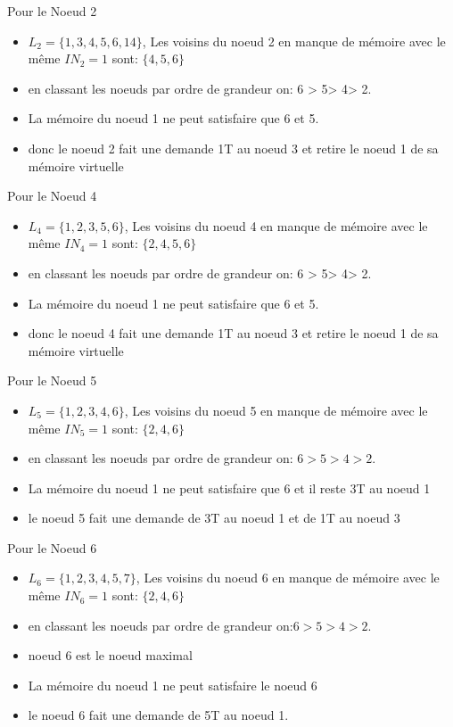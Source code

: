 \documentclass[10pt, c]{beamer}
\begin{document}
    \begin{frame}{Pour le Noeud 2}
    \begin{itemize}
        \item  $L_2 = \{1,3,4,5,6,14\}$, Les voisins du noeud 2 en manque de mémoire avec le même $IN_2 = 1$ sont:  $\{4,5,6\}$
        \item en classant les noeuds par ordre de grandeur on: 6 > 5> 4> 2.
        \item La mémoire du noeud 1 ne peut satisfaire que 6 et 5.
        \item  donc le noeud 2 fait une demande 1T au noeud 3 et retire le noeud 1 de sa mémoire virtuelle
    \end{itemize}
    \end{frame}
    \begin{frame}{Pour le Noeud 4}
    \begin{itemize}
        \item  $L_4 = \{1,2,3,5,6\}$, Les voisins du noeud 4 en manque de mémoire avec le même $IN_4= 1$ sont:  $\{2,4,5,6\}$
        \item en classant les noeuds par ordre de grandeur on: 6 > 5> 4> 2.
        \item La mémoire du noeud 1 ne peut satisfaire que 6 et 5.
        \item  donc le noeud 4 fait une demande 1T au noeud 3 et retire le noeud 1 de sa mémoire virtuelle
    \end{itemize}
    \end{frame}
     \begin{frame}{Pour le Noeud 5}
    \begin{itemize}
        \item  $L_5 = \{1,2,3,4,6\}$, Les voisins du noeud 5 en manque de mémoire avec le même $IN_5 = 1$ sont:  $\{2,4,6\}$
        \item en classant les noeuds par ordre de grandeur on: $6 > 5> 4> 2.$
        \item La mémoire du noeud 1 ne peut satisfaire que 6 et il reste 3T au noeud 1 
        \item le noeud 5 fait une demande de 3T au noeud 1 et de 1T au noeud 3
    \end{itemize}
    \end{frame}
    \begin{frame}{Pour le Noeud 6}
    \begin{itemize}
        \item  $L_6 = \{1,2,3,4,5,7\}$, Les voisins du noeud 6 en manque de mémoire avec le même $IN_6 = 1$ sont:  $\{2,4,6\}$
        \item en classant les noeuds par ordre de grandeur on:$ 6 > 5> 4> 2.$
        \item noeud 6 est le noeud maximal 
        \item La mémoire du noeud 1 ne peut satisfaire le noeud 6
        \item le noeud 6 fait une demande de 5T au noeud 1.
    \end{itemize}
    \end{frame}
\end{document}
